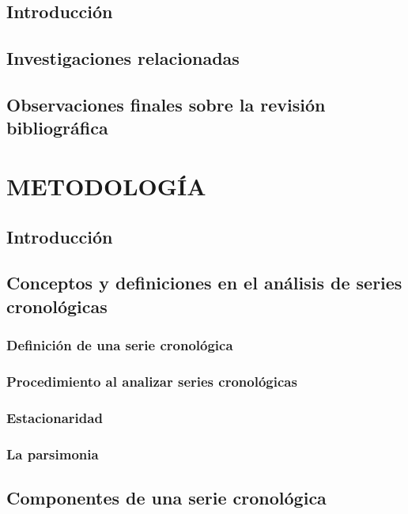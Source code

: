 \documentclass[
]{article}
\begin{document}
\subsection{Introducción}

\subsection{Investigaciones relacionadas}

\subsection{Observaciones finales sobre la revisión bibliográfica}

\newpage

\section{METODOLOGÍA}

\subsection{Introducción}

\subsection{Conceptos y definiciones en el análisis de series cronológicas}

\subsubsection{Definición de una serie cronológica}

\subsubsection{Procedimiento al analizar series cronológicas}

\subsubsection{Estacionaridad}

\subsubsection{La parsimonia}

\subsection{Componentes de una serie cronológica}
\end{document}
